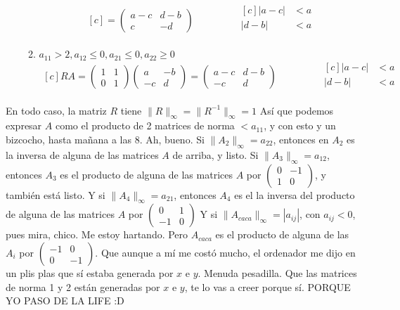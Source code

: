 \documentclass{article}
\newcommand\tab[1][0.6cm]{\hspace*{#1}}
\newcommand\nl{\newline\tab}
\begin{document}
\begin{enumerate}
\begin{enumerate}
$$\begin{aligned}[c]
			= 
			\begin{pmatrix}
			a-c & d-b \\
			c & -d 
			\end{pmatrix}
			\end{aligned}
			\qquad\qquad
			\begin{aligned}[c]
			|a - c| &< a\\
			|d - b| &< a\\
			\end{aligned}
			$$
			\item $a_{11} > 2, a_{12} \leq 0, a_{21} \leq 0, a_{22} \geq 0$ \nl
			$$
			\begin{aligned}[c]
			RA = 
			\begin{pmatrix}
			1 & 1 \\
			0 & 1 
			\end{pmatrix} 
			\begin{pmatrix}
			a & -b \\
			-c & d 
			\end{pmatrix} 
			= 
			\begin{pmatrix}
			a-c & d-b \\
			-c & d 
			\end{pmatrix}
			\end{aligned}
			\qquad\qquad
			\begin{aligned}[c]
			|a - c| &< a\\
			|d - b| &< a\\
			\end{aligned}
			$$
		\end{enumerate}
	\end{enumerate}
	\tab En todo caso, la matriz $R$ tiene $\|R\|_\infty = \|R^{-1}\|_\infty= 1$ \nl Así que podemos expresar $A$ como el producto de 2 matrices de norma $< a_{11}$, y con esto y un bizcocho, hasta mañana a las 8. \nl
	Ah, bueno.
	Si $\|A_2\|_\infty = a_{22}$, entonces en $A_2$ es la inversa de alguna de las matrices $A$ de arriba, y listo. Si $\|A_3\|_\infty = a_{12}$, entonces $A_3$ es el producto de alguna de las matrices $A$ por $\begin{pmatrix}
	0 & -1 \\
	1 & 0 
	\end{pmatrix} $,
	y también está listo. Y si $\|A_4\|_\infty = a_{21}$, entonces $A_4$ es el la inversa del producto de alguna de las matrices $A$ por $\begin{pmatrix}
	0 & 1 \\
	-1 & 0 
	\end{pmatrix} $ \nl
	Y si $\|A_{caca}\|_\infty = |a_{ij}|$, con $a_{ij} < 0$, pues mira, chico. Me estoy hartando. Pero $A_{caca}$ es el producto de alguna de las $A_i$ por  $\begin{pmatrix}
	-1 & 0 \\
	0 & -1 
	\end{pmatrix} $. Que aunque a mí me costó mucho, el ordenador me dijo en un plis plas que sí estaba generada por $x$ e $y$.\nl \nl
	Menuda pesadilla. Que las matrices de norma 1 y 2 están generadas por $x$ e $y$, te lo vas a creer porque sí. \nl PORQUE YO PASO DE LA LIFE :D
	
\end{document}
